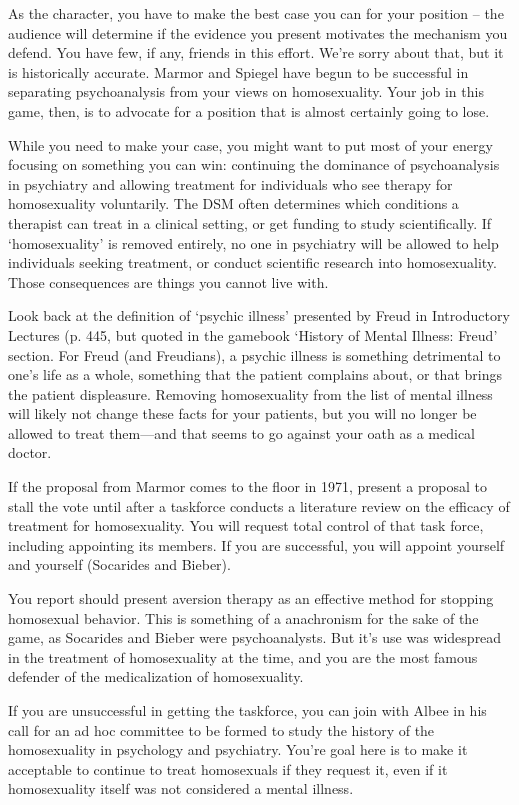 \begin{refsection}
As the character, you have to make the best case you can for your position – the audience will determine if the evidence you present motivates the mechanism you defend. You have few, if any, friends in this effort. We're sorry about that, but it is historically accurate. Marmor and Spiegel have begun to be successful in separating psychoanalysis from your views on homosexuality. Your job in this game, then, is to advocate for a position that is almost certainly going to lose. 

While you need to make your case, you might want to put most of your energy focusing on something you can win: continuing the dominance of psychoanalysis in psychiatry and allowing treatment for individuals who see therapy for homosexuality voluntarily. The DSM often determines which conditions a therapist can treat in a clinical setting, or get funding to study scientifically. If `homosexuality' is removed entirely, no one in psychiatry will be allowed to help individuals seeking treatment, or conduct scientific research into homosexuality. Those consequences are things you cannot live with. 

Look back at the definition of `psychic illness' presented by Freud in Introductory Lectures (p. 445, but quoted in the gamebook `History of Mental Illness: Freud' section. For Freud (and Freudians), a psychic illness is something detrimental to one's life as a whole, something that the patient complains about, or that brings the patient displeasure. Removing homosexuality from the list of mental illness will likely not change these facts for your patients, but you will no longer be allowed to treat them---and that seems to go against your oath as a medical doctor.

If the proposal from Marmor comes to the floor in 1971, present a proposal to stall the vote until after a taskforce conducts a literature review on the efficacy of treatment for homosexuality. You will request total control of that task force, including appointing its members. If you are successful, you will appoint yourself and yourself (Socarides and Bieber). 

You report should present aversion therapy as an effective method for stopping homosexual behavior. This is something of a anachronism for the sake of the game, as Socarides and Bieber were psychoanalysts. But it's use was widespread in the treatment of homosexuality at the time, and you are the most famous defender of the medicalization of homosexuality.

If you are unsuccessful in getting the taskforce, you can join with Albee in his call for an ad hoc committee to be formed to study the history of the homosexuality in psychology and psychiatry. You're goal here is to make it acceptable to continue to treat homosexuals if they request it, even if it homosexuality itself was not considered a mental illness.


\end{refsection}
